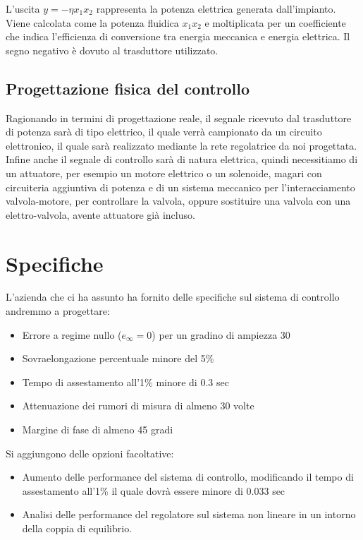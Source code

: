 \documentclass{article}
\begin{document}
L'uscita $y=-\eta x_1 x_2$ rappresenta la potenza elettrica generata dall'impianto. Viene calcolata come la potenza fluidica $x_1 x_2$ e moltiplicata per un coefficiente che indica l'efficienza di conversione tra energia meccanica e energia elettrica. Il segno negativo è dovuto al trasduttore utilizzato.


\subsection{Progettazione fisica del controllo}

Ragionando in termini di progettazione reale, il segnale ricevuto dal trasduttore di potenza sarà di tipo elettrico, il quale verrà campionato da un circuito elettronico, il quale sarà realizzato mediante la rete regolatrice da noi progettata. 
Infine anche il segnale di controllo sarà di natura elettrica, quindi necessitiamo di un attuatore, per esempio un motore elettrico o un solenoide, magari con circuiteria aggiuntiva di potenza e di un sistema meccanico per l'interacciamento valvola-motore, per controllare la valvola, oppure sostituire una valvola con una elettro-valvola, avente attuatore già incluso.

\section{Specifiche}

L'azienda che ci ha assunto ha fornito delle specifiche sul sistema di controllo andremmo a progettare:

\begin{itemize}
    \item Errore a regime nullo ($e_{\infty}=0$) per un gradino di ampiezza 30
    \item Sovraelongazione percentuale minore del 5\%
    \item Tempo di assestamento all'1\% minore di 0.3 sec
    \item Attenuazione dei rumori di misura di almeno 30 volte
    \item Margine di fase di almeno 45 gradi
\end{itemize}

Si aggiungono delle opzioni facoltative:
\begin{itemize}
    \item Aumento delle performance del sistema di controllo, modificando il tempo di assestamento all'1\% il quale dovrà essere minore di 0.033 sec
    \item Analisi delle performance del regolatore sul sistema non lineare in un intorno della coppia di equilibrio.
\end{itemize}
\end{document}
